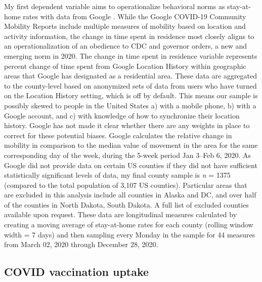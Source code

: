 My first dependent variable aims to operationalize behavioral norms as
stay-at-home rates with data from Google \citep{google2020}. While the Google
COVID-19 Community Mobility Reports include multiple measures of mobility based
on location and activity information, the change in time spent in residence most
closely aligns to an operationalization of an obedience to CDC and governor
orders, a new and emerging norm in 2020. The change in time spent in residence
variable represents percent change of time spent from Google Location History
within geographic areas that Google has designated as a residential area. These
data are aggregated to the county-level based on anonymized sets of data from
users who have turned on the Location History setting, which is off by default.
This means our sample is possibly skewed to people in the United States a) with
a mobile phone, b) with a Google account, and c) with knowledge of how to
synchronize their location history. Google has not made it clear whether there
are any weights in place to correct for these potential biases. Google
calculates the relative change in mobility in comparison to the median value of
movement in the area for the same corresponding day of the week, during the
5-week period Jan 3--Feb 6, 2020. As Google did not provide data on certain US
counties if they did not have sufficient statistically significant levels of
data, my final county sample is \emph{n} = 1375 (compared to the total
population of 3,107 US counties). Particular areas that are excluded in this
analysis include all counties in Alaska and DC, and over half of the counties in
North Dakota, South Dakota. A full list of excluded counties available upon
request. These data are longitudinal measures calculated by creating a moving
average of stay-at-home rates for each county (rolling window width = 7 days)
and then sampling every Monday in the sample for 44 measures from March 02, 2020
through December 28, 2020.

\hypertarget{covid-vaccination-uptake}{\subsection{COVID vaccination uptake}\label{covid-vaccination-uptake}}



